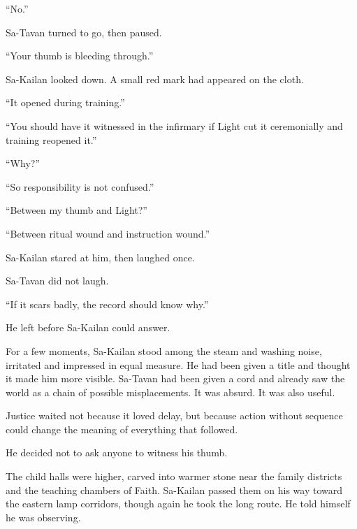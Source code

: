“No.”\par

Sa-Tavan turned to go, then paused.\par

“Your thumb is bleeding through.”\par

Sa-Kailan looked down.
A small red mark had appeared on the cloth.\par

“It opened during training.”\par

“You should have it witnessed in the infirmary if Light cut it ceremonially and training reopened it.”\par

“Why?”\par

“So responsibility is not confused.”\par

“Between my thumb and Light?”\par

“Between ritual wound and instruction wound.”\par

Sa-Kailan stared at him, then laughed once.\par

Sa-Tavan did not laugh.\par

“If it scars badly, the record should know why.”\par

He left before Sa-Kailan could answer.\par

For a few moments, Sa-Kailan stood among the steam and washing noise, irritated and impressed in equal measure.
He had been given a title and thought it made him more visible.
Sa-Tavan had been given a cord and already saw the world as a chain of possible misplacements.
It was absurd.
It was also useful.\par

Justice waited not because it loved delay, but because action without sequence could change the meaning of everything that followed.\par

He decided not to ask anyone to witness his thumb.\par

The child halls were higher, carved into warmer stone near the family districts and the teaching chambers of Faith.
Sa-Kailan passed them on his way toward the eastern lamp corridors, though again he took the long route.
He told himself he was observing.\par

